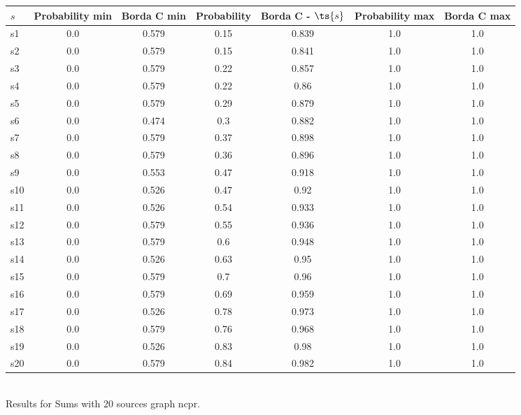 \documentclass{article}
\begin{document}
\noindent\begin{tabular}{|l|c|c|c|c|c|c|}
\hline
$s$& Probability min & Borda C min & Probability & Borda C - $\ts{s}$ & Probability max & Borda C max\\
\hline
s1 &0.0 & 0.579 & 0.15 & 0.839 & 1.0 & 1.0\\
\hline
s2 &0.0 & 0.579 & 0.15 & 0.841 & 1.0 & 1.0\\
\hline
s3 &0.0 & 0.579 & 0.22 & 0.857 & 1.0 & 1.0\\
\hline
s4 &0.0 & 0.579 & 0.22 & 0.86 & 1.0 & 1.0\\
\hline
s5 &0.0 & 0.579 & 0.29 & 0.879 & 1.0 & 1.0\\
\hline
s6 &0.0 & 0.474 & 0.3 & 0.882 & 1.0 & 1.0\\
\hline
s7 &0.0 & 0.579 & 0.37 & 0.898 & 1.0 & 1.0\\
\hline
s8 &0.0 & 0.579 & 0.36 & 0.896 & 1.0 & 1.0\\
\hline
s9 &0.0 & 0.553 & 0.47 & 0.918 & 1.0 & 1.0\\
\hline
s10 &0.0 & 0.526 & 0.47 & 0.92 & 1.0 & 1.0\\
\hline
s11 &0.0 & 0.526 & 0.54 & 0.933 & 1.0 & 1.0\\
\hline
s12 &0.0 & 0.579 & 0.55 & 0.936 & 1.0 & 1.0\\
\hline
s13 &0.0 & 0.579 & 0.6 & 0.948 & 1.0 & 1.0\\
\hline
s14 &0.0 & 0.526 & 0.63 & 0.95 & 1.0 & 1.0\\
\hline
s15 &0.0 & 0.579 & 0.7 & 0.96 & 1.0 & 1.0\\
\hline
s16 &0.0 & 0.579 & 0.69 & 0.959 & 1.0 & 1.0\\
\hline
s17 &0.0 & 0.526 & 0.78 & 0.973 & 1.0 & 1.0\\
\hline
s18 &0.0 & 0.579 & 0.76 & 0.968 & 1.0 & 1.0\\
\hline
s19 &0.0 & 0.526 & 0.83 & 0.98 & 1.0 & 1.0\\
\hline
s20 &0.0 & 0.579 & 0.84 & 0.982 & 1.0 & 1.0\\
\hline
\end{tabular}\\

\noindent Results for Sums with 20 sources graph ncpr.
\end{document}
